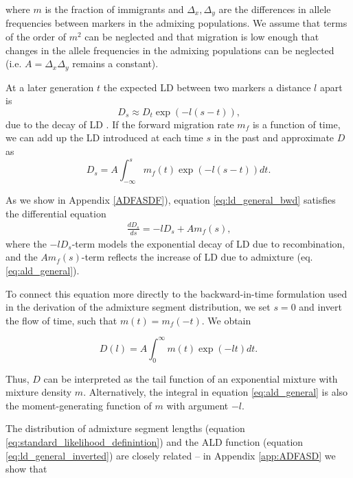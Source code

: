 \documentclass[11pt]{article}
\begin{document}
where $m$ is the fraction of immigrants and $\Delta_x, \Delta_y$ are the differences in allele frequencies between markers in the admixing populations. We assume that terms of the order of $m^2$ can be neglected and that migration is low enough that changes in the allele frequencies in the admixing populations can be neglected (i.e. $A=\Delta_x\Delta_y$ remains a constant). 

At a later generation $t$ the expected LD between two markers a distance $l$ apart is
\begin{equation}
    D_s \approx D_t \exp(-l(s-t))\text{,}
\end{equation}
due to the decay of LD \cite[e.g.][]{sankararaman_date_2012}. If the forward migration rate $m_f$ is a function of time, we can add up the LD introduced at each time $s$ in the past and approximate $D$ as 
\begin{equation}
    D_s = A\int_{-\infty}^s m_f(t)\exp(-l(s-t)) dt \text{.} \label{eq:ld_general_bwd}
\end{equation}

As we show in Appendix \ref{ADFASDF}), equation \ref{eq:ld_general_bwd} satisfies the differential equation
\begin{align}
    \frac{dD_s}{ds} = -l D_s + A m_f(s)\text{,}
\end{align}
where the $-l D_s$-term models the exponential decay of LD due to recombination, and the $A m_f(s)$-term reflects the increase of LD due to admixture (eq. \ref{eq:ald_general}).

To connect this equation more directly to the backward-in-time formulation used in the derivation of the admixture segment distribution, we set $s=0$ and invert the flow of time, such that $m(t) = m_f(-t)$. We obtain

\begin{equation}
\label{eq:ld_general_inverted}
    D(l) = A\int_0^{\infty} m(t)\exp(-lt) dt \text{.} 
\end{equation}

Thus, $D$ can be interpreted as the tail function of an exponential mixture with mixture density $m$. Alternatively, the integral in equation \ref{eq:ald_general} is also the moment-generating function of $m$ with argument $-l$. 

The distribution of admixture segment lengths (equation \ref{eq:standard_likelihood_definintion}) and the ALD function (equation \ref{eq:ld_general_inverted}) are closely related -- in Appendix \ref{app:ADFASD} we show that 
\end{document}
